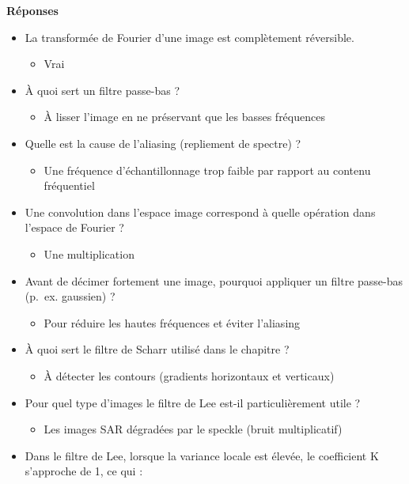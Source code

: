 \documentclass[
  french,
  11pt,
  letterpaper,
  open=any,
  twoside=false,
  french]{scrbook}
\providecommand{\tightlist}{%
  \setlength{\itemsep}{0pt}\setlength{\parskip}{0pt}}
\begin{document}
\textbf{Réponses}

\begin{itemize}
\tightlist
\item
  La transformée de Fourier d'une image est complètement réversible.

  \begin{itemize}
  \tightlist
  \item
    Vrai
  \end{itemize}
\item
  À quoi sert un filtre passe-bas ?

  \begin{itemize}
  \tightlist
  \item
    À lisser l'image en ne préservant que les basses fréquences
  \end{itemize}
\item
  Quelle est la cause de l'aliasing (repliement de spectre) ?

  \begin{itemize}
  \tightlist
  \item
    Une fréquence d'échantillonnage trop faible par rapport au contenu
    fréquentiel
  \end{itemize}
\item
  Une convolution dans l'espace image correspond à quelle opération dans
  l'espace de Fourier ?

  \begin{itemize}
  \tightlist
  \item
    Une multiplication
  \end{itemize}
\item
  Avant de décimer fortement une image, pourquoi appliquer un filtre
  passe-bas (p.~ex. gaussien) ?

  \begin{itemize}
  \tightlist
  \item
    Pour réduire les hautes fréquences et éviter l'aliasing
  \end{itemize}
\item
  À quoi sert le filtre de Scharr utilisé dans le chapitre ?

  \begin{itemize}
  \tightlist
  \item
    À détecter les contours (gradients horizontaux et verticaux)
  \end{itemize}
\item
  Pour quel type d'images le filtre de Lee est-il particulièrement utile
  ?

  \begin{itemize}
  \tightlist
  \item
    Les images SAR dégradées par le speckle (bruit multiplicatif)
  \end{itemize}
\item
  Dans le filtre de Lee, lorsque la variance locale est élevée, le
  coefficient K s'approche de 1, ce qui :


\end{itemize}
\end{document}
